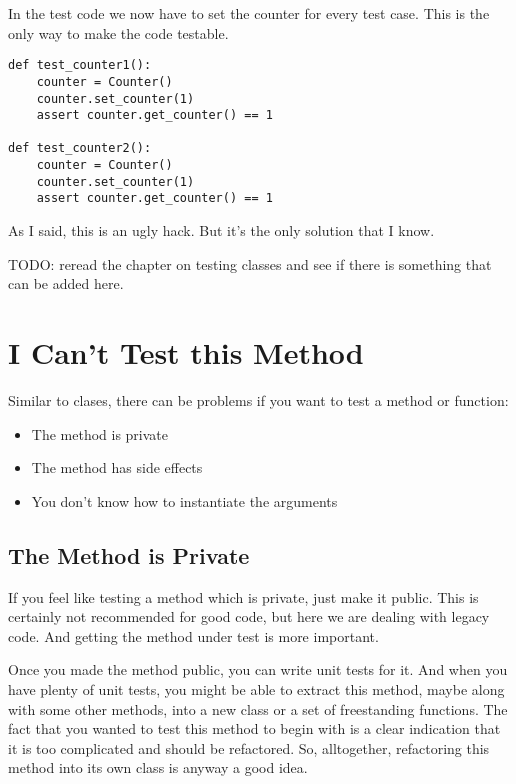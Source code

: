 In the test code we now have to set the counter for every test case. This is the only way to make the code testable.

\begin{programcode}{}
\begin{verbatim}
def test_counter1():
    counter = Counter()
    counter.set_counter(1)
    assert counter.get_counter() == 1

def test_counter2():
    counter = Counter()
    counter.set_counter(1)
    assert counter.get_counter() == 1
\end{verbatim}
\end{programcode}

As I said, this is an ugly hack. But it's the only solution that I know.

TODO: reread the chapter on testing classes and see if there is something that can be added here.

\chapter{I Can't Test this Method}

Similar to clases, there can be problems if you want to test a method or function:

\begin{itemize}
\item The method is private
\item The method has side effects
\item You don't know how to instantiate the arguments
\end{itemize}

\section{The Method is Private}

If you feel like testing a method which is private, just make it public. This is certainly not recommended for good code, but here we are dealing with legacy code. And getting the method under test is more important.

Once you made the method public, you can write unit tests for it. And when you have plenty of unit tests, you might be able to extract this method, maybe along with some other methods, into a new class or a set of freestanding functions. The fact that you wanted to test this method to begin with is a clear indication that it is too complicated and should be refactored. So, alltogether, refactoring this method into its own class is anyway a good idea.


